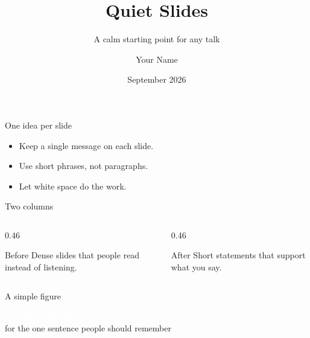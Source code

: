 \documentclass[aspectratio=169, 11pt]{beamer}
\title[Quiet Slides]{Quiet Slides}
\subtitle{A calm starting point for any talk}
\author{Your Name}
\date{September 2026}
\begin{document}
\begin{frame}[plain]
  \titlepage
\end{frame}

\begin{frame}{One idea per slide}
  \begin{itemize}
    \item Keep a single message on each slide.
    \item Use short phrases, not paragraphs.
    \item Let white space do the work.
  \end{itemize}
\end{frame}

\begin{frame}{Two columns}
  \begin{columns}[T]
    \begin{column}{0.46\textwidth}
      \begin{block}{Before}
        Dense slides that people read instead of listening.
      \end{block}
    \end{column}
    \begin{column}{0.46\textwidth}
      \begin{block}{After}
        Short statements that support what you say.
      \end{block}
    \end{column}
  \end{columns}
\end{frame}

\begin{frame}{A simple figure}
  \centering
\end{frame}

{
\begin{frame}[plain]
  \centering\vfill
  {\Huge\bfseries\textcolor{white}{A statement slide}}\\[0.6em]
  {\large\textcolor{teal!60}{for the one sentence people should remember}}
  \vfill
\end{frame}
}
\end{document}
